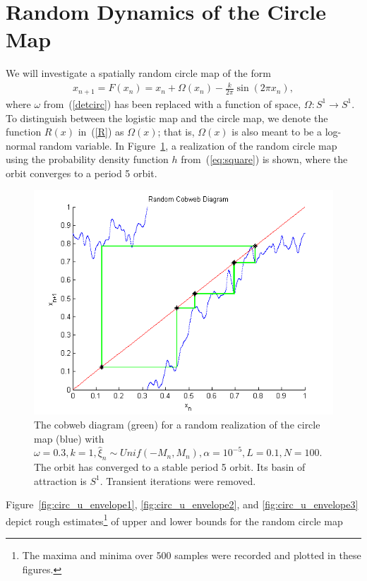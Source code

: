 \section{Random Dynamics of the Circle Map}
We will investigate a spatially random circle map of the form
\begin{align}\label{randcirc}
x_{n+1}= F(x_n) =  x_n + \Omega(x_n) - \frac{k}{2\pi}\sin(2\pi x_n),
\end{align}
where $\omega$ from~(\ref{detcirc}) has been replaced with a function
of space, $\Omega:S^1\to S^1$. To distinguish between the logistic map
and the circle map, we denote the function $R(x)$ in~(\ref{R}) as
$\Omega(x)$; that is, $\Omega(x)$ is also meant to be a log-normal random
variable. In Figure~\ref{fig:rcircstable}, a realization of the
random circle map using the probability density function $h$
from~(\ref{eq:square}) is shown, where the orbit converges to a period 5 orbit. 
\begin{figure}[!h]
\caption[Random circle map, stable orbit under the uniform distribution]{The cobweb
  diagram (green) for a random realization of the circle map (blue) with $\omega =
  0.3, k=1, \hat{\xi}_n \sim Unif(-M_n,M_n), \alpha = 10^{-5},L=0.1, N=100$. The orbit
  has converged to a stable period 5 orbit. Its basin of attraction is
  $S^1$. Transient iterations were removed.}\label{fig:rcircstable}
	\begin{center}
		\includegraphics[scale=0.7]{figs/randcirc_cobweb.png}
	\end{center}
\end{figure}
Figure~\ref{fig:circ_u_envelope1}, \ref{fig:circ_u_envelope2}, and \ref{fig:circ_u_envelope3} depict rough estimates\footnote{The
  maxima and minima over 500 samples were recorded and plotted in
  these figures.} of upper and lower bounds for the random circle map
